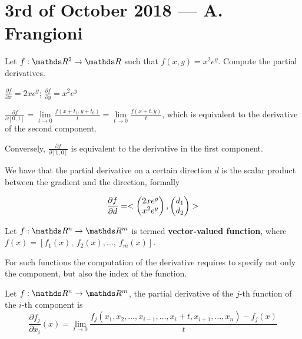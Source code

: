 \documentclass[ComputationalMathematics.tex]{subfiles}
\begin{document}
\section{3rd of October 2018 --- A. Frangioni}
\begin{example}[On derivatives]
Let $f:\R^2 \to \R$ such that $f(x, y) = x^2 e^y$. Compute the partial derivatives.

$\frac{\partial f}{\partial x} = 2x e^y $; $\frac{\partial f}{\partial y} = x^2 e^y $

$\frac{\partial f}{\partial [0, 1]} = \lim\limits_{t \to 0} \frac{f(x + t_1, y + t_0)}{t} =  \lim\limits_{t \to 0} \frac{f(x + t, y)}{t}$, which is equivalent to the derivative of the second component.

Conversely, $\frac{\partial f}{\partial [1, 0]}$ is equivalent to the derivative in the first component.
\end{example}
We have that the partial derivative on a certain direction $d$ is the scalar product between the gradient and the direction, formally

\[
  \frac{\partial f}{\partial d} = <\begin{pmatrix}2x e^y\\ x^2 e^y\end{pmatrix}, \begin{pmatrix} d_1\\ d_2 \end{pmatrix}>
\]

\begin{definition}
  Let $f: \R^n \to \R^m$ is termed \textbf{vector-valued function}, where $f(x) =  [f_1(x),~f_2(x), \ldots,~f_m(x)]$.
\end{definition}

For such functions the computation of the derivative requires to specify not only the component, but also the index of the function.

\begin{definition}
Let $f: \R^n \to \R^m$, the partial derivative of the $j$-th function of the $i$-th component is
\[
   \frac{\partial f_{j}}{\partial x_i}(x) =
   \lim_{t \to 0} \frac{f_{j}(x_1, x_2, \ldots, x_{i-1}, \ldots, x_i + t, x_{i+1}, \ldots, x_n) - f_{j}(x)}{t}
\]
\end{definition}
\end{document}
